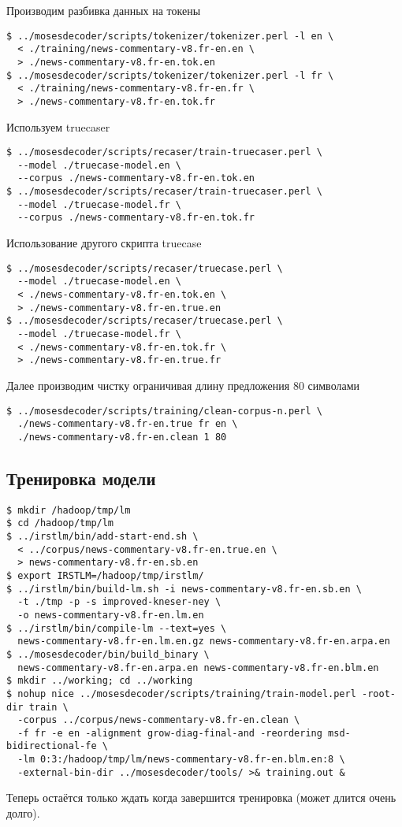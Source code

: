 Производим разбивка данных на токены
\begin{lstlisting}
$ ../mosesdecoder/scripts/tokenizer/tokenizer.perl -l en \
  < ./training/news-commentary-v8.fr-en.en \
  > ./news-commentary-v8.fr-en.tok.en
$ ../mosesdecoder/scripts/tokenizer/tokenizer.perl -l fr \
  < ./training/news-commentary-v8.fr-en.fr \
  > ./news-commentary-v8.fr-en.tok.fr
\end{lstlisting}

Используем truecaser
\begin{lstlisting}
$ ../mosesdecoder/scripts/recaser/train-truecaser.perl \
  --model ./truecase-model.en \
  --corpus ./news-commentary-v8.fr-en.tok.en
$ ../mosesdecoder/scripts/recaser/train-truecaser.perl \
  --model ./truecase-model.fr \
  --corpus ./news-commentary-v8.fr-en.tok.fr
\end{lstlisting}

Использование другого скрипта truecase
\begin{lstlisting}
$ ../mosesdecoder/scripts/recaser/truecase.perl \
  --model ./truecase-model.en \
  < ./news-commentary-v8.fr-en.tok.en \
  > ./news-commentary-v8.fr-en.true.en
$ ../mosesdecoder/scripts/recaser/truecase.perl \
  --model ./truecase-model.fr \
  < ./news-commentary-v8.fr-en.tok.fr \
  > ./news-commentary-v8.fr-en.true.fr
\end{lstlisting}

Далее производим чистку ограничивая длину предложения 80 символами
\begin{lstlisting}
$ ../mosesdecoder/scripts/training/clean-corpus-n.perl \
  ./news-commentary-v8.fr-en.true fr en \
  ./news-commentary-v8.fr-en.clean 1 80
\end{lstlisting}

\subsection{Тренировка модели}
\begin{lstlisting}
$ mkdir /hadoop/tmp/lm
$ cd /hadoop/tmp/lm
$ ../irstlm/bin/add-start-end.sh \
  < ../corpus/news-commentary-v8.fr-en.true.en \
  > news-commentary-v8.fr-en.sb.en
$ export IRSTLM=/hadoop/tmp/irstlm/
$ ../irstlm/bin/build-lm.sh -i news-commentary-v8.fr-en.sb.en \
  -t ./tmp -p -s improved-kneser-ney \
  -o news-commentary-v8.fr-en.lm.en
$ ../irstlm/bin/compile-lm --text=yes \
  news-commentary-v8.fr-en.lm.en.gz news-commentary-v8.fr-en.arpa.en
$ ../mosesdecoder/bin/build_binary \
  news-commentary-v8.fr-en.arpa.en news-commentary-v8.fr-en.blm.en
$ mkdir ../working; cd ../working
$ nohup nice ../mosesdecoder/scripts/training/train-model.perl -root-dir train \
  -corpus ../corpus/news-commentary-v8.fr-en.clean \
  -f fr -e en -alignment grow-diag-final-and -reordering msd-bidirectional-fe \
  -lm 0:3:/hadoop/tmp/lm/news-commentary-v8.fr-en.blm.en:8 \
  -external-bin-dir ../mosesdecoder/tools/ >& training.out &
\end{lstlisting}
Теперь остаётся только ждать когда завершится тренировка (может длится очень долго).

